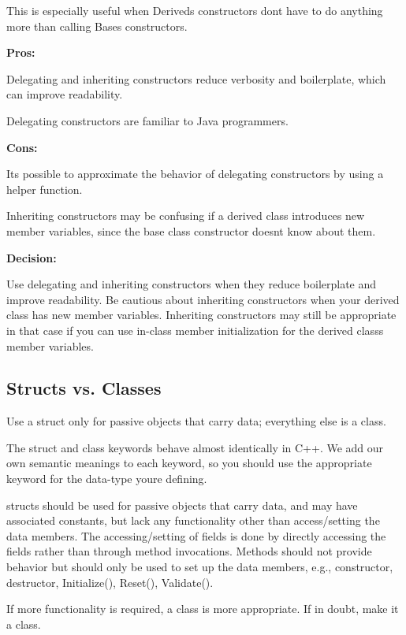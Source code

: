 This is especially useful when Derived\textquotesingle{}s constructors don\textquotesingle{}t have to do anything more than calling Base\textquotesingle{}s constructors.

{\bfseries Pros\+:}

Delegating and inheriting constructors reduce verbosity and boilerplate, which can improve readability.

Delegating constructors are familiar to Java programmers.

{\bfseries Cons\+:}

It\textquotesingle{}s possible to approximate the behavior of delegating constructors by using a helper function.

Inheriting constructors may be confusing if a derived class introduces new member variables, since the base class constructor doesn\textquotesingle{}t know about them.

{\bfseries Decision\+:}

Use delegating and inheriting constructors when they reduce boilerplate and improve readability. Be cautious about inheriting constructors when your derived class has new member variables. Inheriting constructors may still be appropriate in that case if you can use in-\/class member initialization for the derived class\textquotesingle{}s member variables.

\subsection*{Structs vs. Classes}

Use a struct only for passive objects that carry data; everything else is a class.

The struct and class keywords behave almost identically in C++. We add our own semantic meanings to each keyword, so you should use the appropriate keyword for the data-\/type you\textquotesingle{}re defining.

structs should be used for passive objects that carry data, and may have associated constants, but lack any functionality other than access/setting the data members. The accessing/setting of fields is done by directly accessing the fields rather than through method invocations. Methods should not provide behavior but should only be used to set up the data members, e.\+g., constructor, destructor, Initialize(), Reset(), Validate().

If more functionality is required, a class is more appropriate. If in doubt, make it a class.

